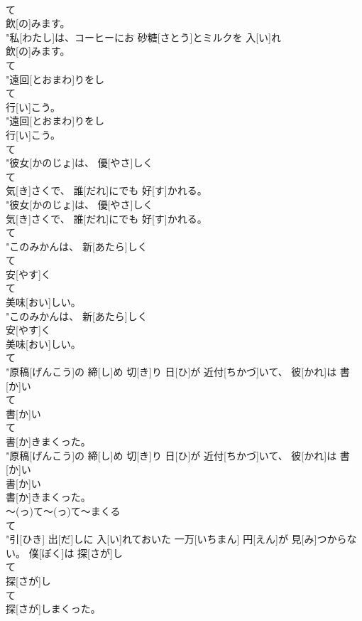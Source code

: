 \documentclass[8pt]{extreport}
\begin{document}
\begin{CJK}{UTF8}{min}
\\	て
\\	飲[の]みます。
\\	"私[わたし]は、コーヒーにお 砂糖[さとう]とミルクを 入[い]れ
\\	飲[の]みます。
\\	て
\\	"遠回[とおまわ]りをし
\\	て
\\	行[い]こう。
\\	"遠回[とおまわ]りをし
\\	行[い]こう。
\\	て
\\	"彼女[かのじょ]は、 優[やさ]しく
\\	て
\\	気[き]さくで、 誰[だれ]にでも 好[す]かれる。
\\	"彼女[かのじょ]は、 優[やさ]しく
\\	気[き]さくで、 誰[だれ]にでも 好[す]かれる。
\\	て
\\	"このみかんは、 新[あたら]しく
\\	て
\\	安[やす]く
\\	て
\\	美味[おい]しい。
\\	"このみかんは、 新[あたら]しく
\\	安[やす]く
\\	美味[おい]しい。
\\	て
\\	"原稿[げんこう]の 締[し]め 切[き]り 日[ひ]が 近付[ちかづ]いて、 彼[かれ]は 書[か]い
\\	て
\\	書[か]い
\\	て
\\	書[か]きまくった。
\\	"原稿[げんこう]の 締[し]め 切[き]り 日[ひ]が 近付[ちかづ]いて、 彼[かれ]は 書[か]い
\\	書[か]い
\\	書[か]きまくった。
\\	～(っ)て～(っ)て～まくる	
\\	て
\\	"引[ひき] 出[だ]しに 入[い]れておいた 一万[いちまん] 円[えん]が 見[み]つからない。 僕[ぼく]は 探[さが]し
\\	て
\\	探[さが]し
\\	て
\\	探[さが]しまくった。

\end{CJK}
\end{document}
